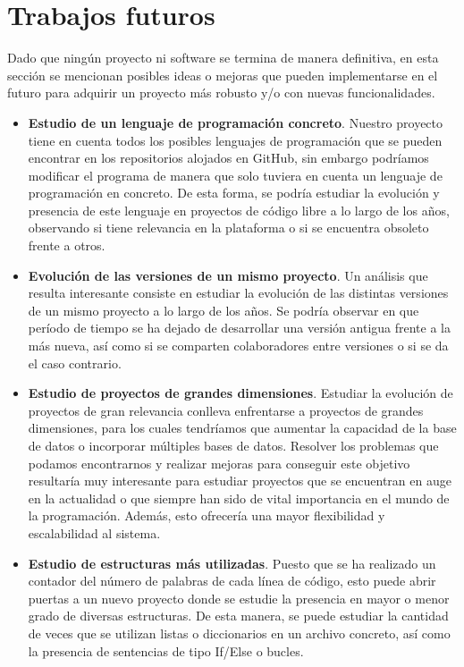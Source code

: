 \documentclass[a4paper, 12pt]{book}
\begin{document}
\section{Trabajos futuros}
\label{sec:trabajos_futuros}

Dado que ningún proyecto ni software se termina de manera definitiva, en esta sección se mencionan posibles ideas o mejoras que pueden implementarse en el futuro para adquirir un proyecto más
robusto y/o con nuevas funcionalidades.

\begin{itemize}
  \item \textbf{Estudio de un lenguaje de programación concreto}. Nuestro proyecto tiene en cuenta todos los posibles lenguajes de programación que se pueden encontrar en los repositorios alojados
  en GitHub, sin embargo podríamos modificar el programa de manera que solo tuviera en cuenta un lenguaje de programación en concreto. De esta forma, se podría estudiar la evolución y presencia de 
  este lenguaje en proyectos de código libre a lo largo de los años, observando si tiene relevancia en la plataforma o si se encuentra obsoleto frente a otros.
  \item \textbf{Evolución de las versiones de un mismo proyecto}. Un análisis que resulta interesante consiste en estudiar la evolución de las distintas versiones de un mismo proyecto a lo largo de los años.
  Se podría observar en que período de tiempo se ha dejado de desarrollar una versión antigua frente a la más nueva, así como si se comparten colaboradores entre versiones o si se da el caso contrario.
  \item \textbf{Estudio de proyectos de grandes dimensiones}. Estudiar la evolución de proyectos de gran relevancia conlleva enfrentarse a proyectos de grandes dimensiones, para los cuales tendríamos
  que aumentar la capacidad de la base de datos o incorporar múltiples bases de datos. Resolver los problemas que podamos encontrarnos y realizar mejoras para conseguir este objetivo resultaría muy
  interesante para estudiar proyectos que se encuentran en auge en la actualidad o que siempre han sido de vital importancia en el mundo de la programación. Además, esto ofrecería una mayor flexibilidad
  y escalabilidad al sistema.
  \item \textbf{Estudio de estructuras más utilizadas}. Puesto que se ha realizado un contador del número de palabras de cada línea de código, esto puede abrir puertas a un nuevo proyecto donde se estudie la
  presencia en mayor o menor grado de diversas estructuras. De esta manera, se puede estudiar la cantidad de veces que se utilizan listas o diccionarios en un archivo concreto, así como la presencia de
  sentencias de tipo If/Else o bucles. 
\end{itemize}
\end{document}
